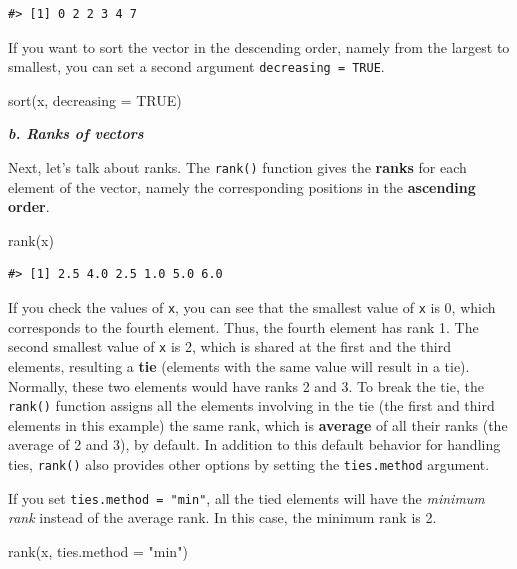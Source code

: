 \documentclass[
]{book}
\newenvironment{Shaded}{\begin{snugshade}}{\end{snugshade}}
\newcommand{\AttributeTok}[1]{\textcolor[rgb]{0.77,0.63,0.00}{#1}}
\newcommand{\ConstantTok}[1]{\textcolor[rgb]{0.00,0.00,0.00}{#1}}
\newcommand{\FunctionTok}[1]{\textcolor[rgb]{0.00,0.00,0.00}{#1}}
\newcommand{\NormalTok}[1]{#1}
\newcommand{\StringTok}[1]{\textcolor[rgb]{0.31,0.60,0.02}{#1}}
\begin{document}
\begin{verbatim}
#> [1] 0 2 2 3 4 7
\end{verbatim}

If you want to sort the vector in the descending order, namely from the largest to smallest, you can set a second argument \texttt{decreasing\ =\ TRUE}.

\begin{Shaded}
\begin{Highlighting}[]
\FunctionTok{sort}\NormalTok{(x, }\AttributeTok{decreasing =} \ConstantTok{TRUE}\NormalTok{)}
\end{Highlighting}
\end{Shaded}

\textbf{\emph{b. Ranks of vectors}}

Next, let's talk about ranks. The \texttt{rank()} function gives the \textbf{ranks} for each element of the vector, namely the corresponding positions in the \textbf{ascending order}.

\begin{Shaded}
\begin{Highlighting}[]
\FunctionTok{rank}\NormalTok{(x)}
\end{Highlighting}
\end{Shaded}

\begin{verbatim}
#> [1] 2.5 4.0 2.5 1.0 5.0 6.0
\end{verbatim}

If you check the values of \texttt{x}, you can see that the smallest value of \texttt{x} is 0, which corresponds to the fourth element. Thus, the fourth element has rank 1. The second smallest value of \texttt{x} is 2, which is shared at the first and the third elements, resulting a \textbf{tie} (elements with the same value will result in a tie). Normally, these two elements would have ranks 2 and 3. To break the tie, the \texttt{rank()} function assigns all the elements involving in the tie (the first and third elements in this example) the same rank, which is \textbf{average} of all their ranks (the average of 2 and 3), by default. In addition to this default behavior for handling ties, \texttt{rank()} also provides other options by setting the \texttt{ties.method} argument.

If you set \texttt{ties.method\ =\ "min"}, all the tied elements will have the \emph{minimum rank} instead of the average rank. In this case, the minimum rank is 2.

\begin{Shaded}
\begin{Highlighting}[]
\FunctionTok{rank}\NormalTok{(x, }\AttributeTok{ties.method =} \StringTok{"min"}\NormalTok{)}
\end{Highlighting}
\end{Shaded}
\end{document}
